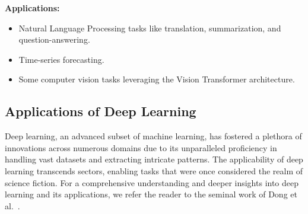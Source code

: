 \textbf{Applications:}
\begin{itemize}
    \item Natural Language Processing tasks like translation, summarization, and question-answering.
    \item Time-series forecasting.
    \item Some computer vision tasks leveraging the Vision Transformer architecture.
\end{itemize}

\subsection{Applications of Deep Learning}

Deep learning, an advanced subset of machine learning, has fostered a plethora of innovations across numerous domains due to its unparalleled proficiency in handling vast datasets and extracting intricate patterns. The applicability of deep learning transcends sectors, enabling tasks that were once considered the realm of science fiction. For a comprehensive understanding and deeper insights into deep learning and its applications, we refer the reader to the seminal work of Dong et al.~\cite{DONG2021100379}.\\

